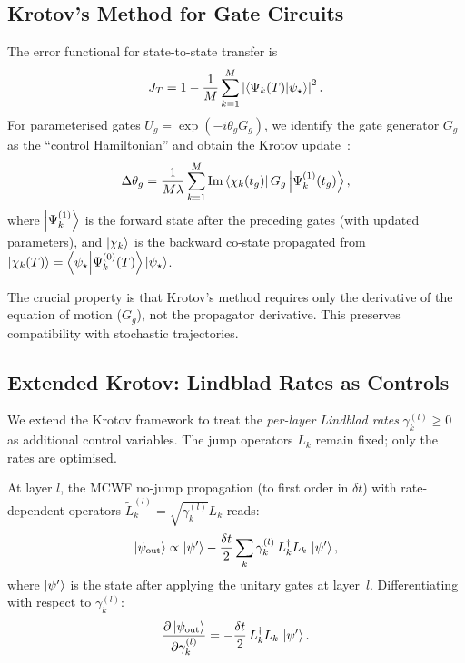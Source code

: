 \documentclass[11pt,a4paper]{article}
\begin{document}
\subsection{Krotov's Method for Gate Circuits}

The error functional for state-to-state transfer is
\begin{equation}
J_T = 1 - \frac{1}{M}\sum_{k=1}^{M}
\left|\braket{\Psi_k(T)}{\psi_\star}\right|^2.
\end{equation}
For parameterised gates $U_g = \exp(-i\theta_g G_g)$, we identify the
gate generator $G_g$ as the ``control Hamiltonian'' and obtain the
Krotov update~\cite{goerz2018}:
\begin{equation}
\Delta\theta_g = \frac{1}{M\lambda}
\sum_{k=1}^{M}
\mathrm{Im}\bra{\chi_k(t_g)} G_g \ket{\Psi_k^{(1)}(t_g)},
\label{eq:krotov_gate}
\end{equation}
where $\ket{\Psi_k^{(1)}}$ is the forward state after the preceding
gates (with updated parameters), and $\ket{\chi_k}$ is the backward
co-state propagated from
$\ket{\chi_k(T)} = \braket{\psi_\star}{\Psi_k^{(0)}(T)}\ket{\psi_\star}$.

The crucial property is that Krotov's method requires only the
derivative of the equation of motion ($G_g$), not the propagator
derivative.  This preserves compatibility with stochastic trajectories.

\subsection{Extended Krotov: Lindblad Rates as Controls}
\label{sec:rate_krotov}

We extend the Krotov framework to treat the \emph{per-layer
Lindblad rates} $\gamma_k^{(l)} \ge 0$ as additional control variables.
The jump operators $L_k$ remain fixed; only the rates are optimised.

At layer $l$, the MCWF no-jump propagation (to first order in $\delta t$)
with rate-dependent operators
$\tilde{L}_k^{(l)} = \sqrt{\gamma_k^{(l)}} L_k$ reads:
\begin{equation}
\ket{\psi_\text{out}} \propto \ket{\psi'} - \frac{\delta t}{2}
\sum_k \gamma_k^{(l)}\, L_k^\dagger L_k\, \ket{\psi'},
\label{eq:nojump}
\end{equation}
where $\ket{\psi'}$ is the state after applying the unitary gates at
layer~$l$.  Differentiating with respect to $\gamma_k^{(l)}$:
\begin{equation}
\frac{\partial\ket{\psi_\text{out}}}{\partial \gamma_k^{(l)}}
= -\frac{\delta t}{2}\, L_k^\dagger L_k\, \ket{\psi'}.
\label{eq:drate}
\end{equation}
\end{document}
